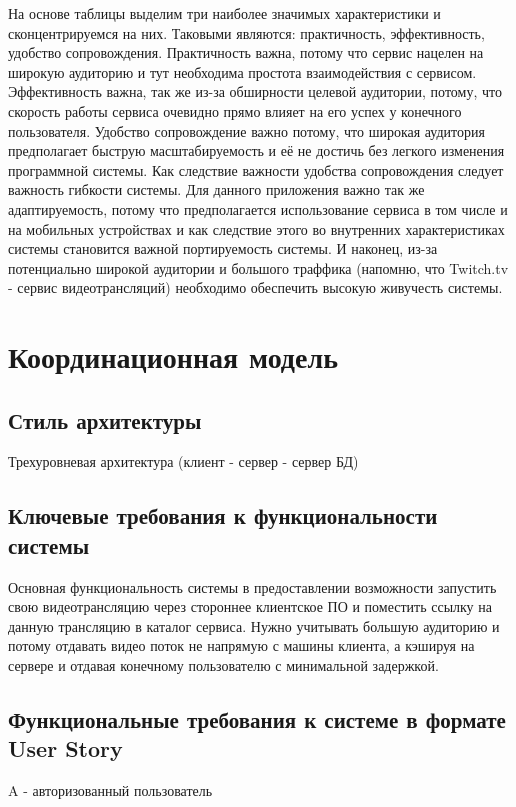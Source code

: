 \documentclass[a4paper]{report}
\begin{document}
На основе таблицы выделим три наиболее значимых характеристики и сконцентрируемся на них. Таковыми являются: практичность, эффективность, удобство сопровождения. Практичность важна, потому что сервис нацелен на широкую аудиторию и тут необходима простота взаимодействия с сервисом. Эффективность важна, так же из-за обширности целевой аудитории, потому, что скорость работы сервиса очевидно прямо влияет на его успех у конечного пользователя. Удобство сопровождение важно потому, что широкая аудитория предполагает быструю масштабируемость и её не достичь без легкого изменения программной системы. Как следствие важности удобства сопровождения следует важность гибкости системы. Для данного приложения важно так же адаптируемость, потому что предполагается использование сервиса в том числе и на мобильных устройствах и как следствие этого во внутренних характеристиках системы становится важной портируемость системы. И наконец, из-за потенциально широкой аудитории и большого траффика (напомню, что Twitch.tv - сервис видеотрансляций) необходимо обеспечить высокую живучесть системы.

\section*{Координационная модель}
\subsection*{Стиль архитектуры}
Трехуровневая архитектура (клиент - сервер - сервер БД)
\subsection*{Ключевые требования к функциональности системы}
Основная функциональность системы в предоставлении возможности запустить свою видеотрансляцию через стороннее клиентское ПО и поместить ссылку на данную трансляцию в каталог сервиса. Нужно учитывать большую аудиторию и потому отдавать видео поток не напрямую с машины клиента, а кэшируя на сервере и отдавая конечному пользователю с минимальной задержкой.

\subsection*{Функциональные требования к системе в формате User Story}
A - авторизованный пользователь
\end{document}

